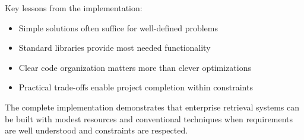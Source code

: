Key lessons from the implementation:
\begin{itemize}[leftmargin=*,itemsep=2pt,topsep=2pt]
 \item Simple solutions often suffice for well-defined problems
 \item Standard libraries provide most needed functionality
 \item Clear code organization matters more than clever optimizations
 \item Practical trade-offs enable project completion within constraints
\end{itemize}

The complete implementation demonstrates that enterprise retrieval systems can be built with modest resources and conventional techniques when requirements are well understood and constraints are respected.
